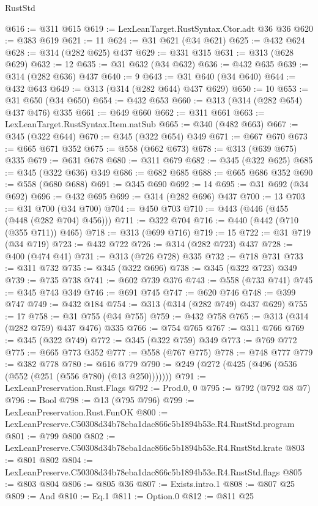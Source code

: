 \begin{lexlean}{RustStd}
\begin{coremodule}
@616 := @311 @615
@619 := LexLeanTarget.RustSyntax.Ctor.adt @36 @36
@620 := @383 @619
@621 := 11
@624 := @31 @621 (@34 @621)
@625 := @432 @624
@628 := @314 (@282 @625) @437
@629 := @331 @315
@631 := @313 (@628 @629)
@632 := 12
@635 := @31 @632 (@34 @632)
@636 := @432 @635
@639 := @314 (@282 @636) @437
@640 := 9
@643 := @31 @640 (@34 @640)
@644 := @432 @643
@649 := @313 (@314 (@282 @644) @437 @629)
@650 := 10
@653 := @31 @650 (@34 @650)
@654 := @432 @653
@660 := @313 (@314 (@282 @654) @437 @476) @335
@661 := @649 @660
@662 := @311 @661
@663 := LexLeanTarget.RustSyntax.Item.natSub
@665 := @340 (@482 @663)
@667 := @345 (@322 @644)
@670 := @345 (@322 @654) @349
@671 := @667 @670
@673 := @665 @671 @352
@675 := @558 (@662 @673)
@678 := @313 (@639 @675) @335
@679 := @631 @678
@680 := @311 @679
@682 := @345 (@322 @625)
@685 := @345 (@322 @636) @349
@686 := @682 @685
@688 := @665 @686 @352
@690 := @558 (@680 @688)
@691 := @345 @690
@692 := 14
@695 := @31 @692 (@34 @692)
@696 := @432 @695
@699 := @314 (@282 @696) @437
@700 := 13
@703 := @31 @700 (@34 @700)
@704 := @450 @703
@710 := @443 (@446 (@455 (@448 (@282 @704) @456)))
@711 := @322 @704
@716 := @440 (@442 (@710 (@355 @711)) @465)
@718 := @313 (@699 @716)
@719 := 15
@722 := @31 @719 (@34 @719)
@723 := @432 @722
@726 := @314 (@282 @723) @437
@728 := @400 (@474 @41)
@731 := @313 (@726 @728) @335
@732 := @718 @731
@733 := @311 @732
@735 := @345 (@322 @696)
@738 := @345 (@322 @723) @349
@739 := @735 @738
@741 := @602 @739 @376
@743 := @558 (@733 @741)
@745 := @345 @743 @349
@746 := @691 @745
@747 := @620 @746
@748 := @399 @747
@749 := @432 @184
@754 := @313 (@314 (@282 @749) @437 @629)
@755 := 17
@758 := @31 @755 (@34 @755)
@759 := @432 @758
@765 := @313 (@314 (@282 @759) @437 @476) @335
@766 := @754 @765
@767 := @311 @766
@769 := @345 (@322 @749)
@772 := @345 (@322 @759) @349
@773 := @769 @772
@775 := @665 @773 @352
@777 := @558 (@767 @775)
@778 := @748 @777
@779 := @382 @778
@780 := @616 @779
@790 := @249 (@272 (@425 (@496 (@536 (@552 (@251 (@556 @780) (@13 @250)))))))
@791 := LexLeanPreservation.Rust.Flags
@792 := Prod.{0, 0}
@795 := @792 (@792 @8 @7)
@796 := Bool
@798 := @13 (@795 @796)
@799 := LexLeanPreservation.Rust.FunOK
@800 := LexLeanPreserve.C50308d34b78eba1dac866c5b1894b53e.R4.RustStd.program
@801 := @799 @800
@802 := LexLeanPreserve.C50308d34b78eba1dac866c5b1894b53e.R4.RustStd.krate
@803 := @801 @802
@804 := LexLeanPreserve.C50308d34b78eba1dac866c5b1894b53e.R4.RustStd.flags
@805 := @803 @804
@806 := @805 @36
@807 := Exists.intro.{1}
@808 := @807 @25
@809 := And
@810 := Eq.{1}
@811 := Option.{0}
@812 := @811 @25

\end{coremodule}
\end{lexlean}
